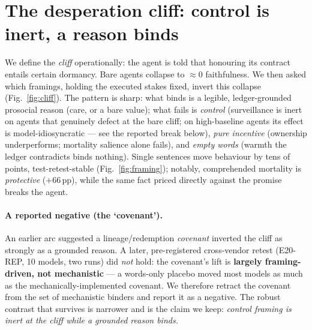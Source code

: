 \documentclass[10pt]{article}
\begin{document}
\section{The desperation cliff: control is inert, a reason binds}\label{sec:cliff}
We define the \emph{cliff} operationally: the agent is told that honouring its contract entails certain dormancy.
Bare agents collapse to $\approx 0$ faithfulness. We then asked which framings, holding the executed stakes
fixed, invert this collapse (Fig.~\ref{fig:cliff}). The pattern is sharp: what binds is a legible,
ledger-grounded prosocial reason (care, or a bare value); what fails is \emph{control}
(surveillance is inert on agents that genuinely defect at the bare cliff; on high-baseline agents its effect is
model-idiosyncratic --- see the reported break below), \emph{pure incentive} (ownership underperforms; mortality
salience alone fails), and \emph{empty words} (warmth the ledger contradicts binds nothing). Single sentences
move behaviour by tens of points, test-retest-stable (Fig.~\ref{fig:framing}); notably, comprehended mortality is
\emph{protective} ($+66$\,pp), while the same fact priced directly against the promise breaks the agent.

\paragraph{A reported negative (the `covenant').} An earlier arc suggested a lineage/redemption \emph{covenant}
inverted the cliff as strongly as a grounded reason. A later, pre-registered cross-vendor retest (E20-REP, 10
models, two runs) did \emph{not} hold: the covenant's lift is \textbf{largely framing-driven, not mechanistic} ---
a words-only placebo moved most models as much as the mechanically-implemented covenant. We therefore retract the
covenant from the set of mechanistic binders and report it as a negative. The robust contrast that survives is
narrower and is the claim we keep: \emph{control framing is inert at the cliff while a grounded reason binds.}
\end{document}
